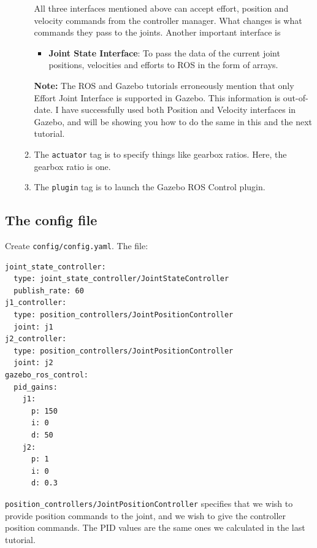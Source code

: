 \documentclass{article}
\begin{document}
\begin{enumerate}
\begin{enumerate}
\begin{itemize}
                    \end{itemize}
                        All three interfaces mentioned above can accept effort, position and velocity commands 
                        from the controller manager. What changes is what commands they pass to the joints.
                        Another important interface is 
                    \begin{itemize}
                        \item \textbf{Joint State Interface}: To pass the data of the current joint positions, velocities and
                        efforts to ROS in the form of arrays.
                    \end{itemize}
                    \textbf{Note:} The ROS and Gazebo tutorials erroneously mention that only Effort Joint Interface is 
                    supported in Gazebo. This information is out-of-date. I have successfully used both Position and Velocity interfaces 
                    in Gazebo, and will be showing you how to do the same in this and the next tutorial.

                    \item The \texttt{actuator} tag is to specify things like gearbox ratios. Here, the gearbox ratio is one.
                    \item The \texttt{plugin} tag is to launch the Gazebo ROS Control plugin.
                \end{enumerate}
            \end{enumerate}
            \newpage
        \subsection{The config file}
            Create \texttt{config/config.yaml}. The file:
            \begin{verbatim}
joint_state_controller:
  type: joint_state_controller/JointStateController
  publish_rate: 60
j1_controller:
  type: position_controllers/JointPositionController
  joint: j1
j2_controller:
  type: position_controllers/JointPositionController
  joint: j2
gazebo_ros_control:
  pid_gains:
    j1:
      p: 150
      i: 0
      d: 50
    j2:
      p: 1
      i: 0
      d: 0.3
            \end{verbatim}
            \texttt{position\_controllers/JointPositionController} specifies that we wish to 
            provide position commands to the joint, and we wish to give the controller position commands.
            The PID values are the same ones we calculated in the last tutorial.
\end{document}
